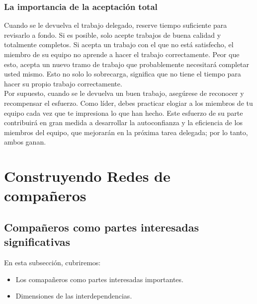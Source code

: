 \documentclass[10pt]{book}
\begin{document}
\subsection{La importancia de la aceptación total}
Cuando se le devuelva el trabajo delegado, reserve tiempo suficiente para revisarlo a fondo. Si es posible, solo acepte trabajos de buena calidad y totalmente completos. Si acepta un trabajo con el que no está satisfecho, el miembro de su equipo no aprende a hacer el trabajo correctamente. Peor que esto, acepta un nuevo tramo de trabajo que probablemente necesitará completar usted mismo. Esto no solo lo sobrecarga, significa que no tiene el tiempo para hacer su propio trabajo correctamente.\\
Por supuesto, cuando se le devuelva un buen trabajo, asegúrese de reconocer y recompensar el esfuerzo. Como líder, debes practicar elogiar a los miembros de tu equipo cada vez que te impresiona lo que han hecho. Este esfuerzo de su parte contribuirá en gran medida a desarrollar la autoconfianza y la eficiencia de los miembros del equipo, que mejorarán en la próxima tarea delegada; por lo tanto, ambos ganan.


\chapter{Construyendo  Redes de compañeros}
\section{Compañeros como partes interesadas significativas}
En esta subsección, cubriremos:
\begin{itemize}
\item Los comapañeros como partes interesadas importantes.
\item Dimensiones de las interdependencias.
\end{itemize}
\end{document}
